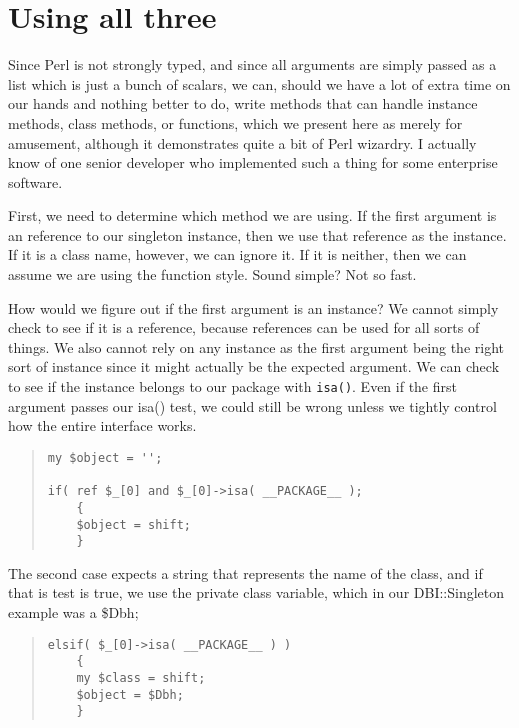     \section{Using all three}
    
Since Perl is not strongly typed, and since all arguments
are simply passed as a list which is just a bunch of
scalars, we can, should we have a lot of extra time on our
hands and nothing better to do, write methods that can
handle instance methods, class methods, or functions, which
we present here as merely for amusement, although it
demonstrates quite a bit of Perl wizardry.  I actually know
of one senior developer who implemented such a thing for
some enterprise software.

First, we need to determine which method we are using.  If
the first argument is an reference to our singleton
instance, then we use that reference as the instance.  If it
is a class name, however, we can ignore it.  If it is
neither, then we can assume we are using the function style.
 Sound simple?  Not so fast.

How would we figure out if the first argument is an
instance?  We cannot simply check to see if it is a
reference, because references can be used for all sorts of
things.  We also cannot rely on any instance as the first
argument being the right sort of instance since it might
actually be the expected argument.  We can check to see if
the instance belongs to our package with {\tt isa()}.  Even
if the first argument passes our isa() test, we could still
be wrong unless we tightly control how the entire interface
works.

\begin{quote}    
\begin{verbatim}
my $object = '';

if( ref $_[0] and $_[0]->isa( __PACKAGE__ );
    {
    $object = shift;
    }        
\end{verbatim}
\end{quote}
        
The second case expects a string that represents the name of the class,
and if that is test is true, we use the private class variable, which 
in our DBI::Singleton example was a \$Dbh;

\begin{quote}    
\begin{verbatim}
elsif( $_[0]->isa( __PACKAGE__ ) )
    {
    my $class = shift;
    $object = $Dbh;
    }
\end{verbatim}
\end{quote}
    
